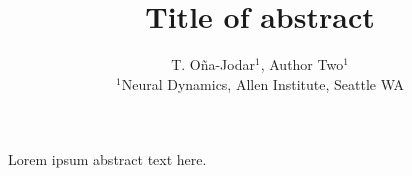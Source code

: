 \documentclass[11pt]{article}
\title{\textbf{Title of abstract}}
\author{T. Oña-Jodar$^{1}$, Author Two$^{1}$\\
{\small $^{1}$Neural Dynamics, Allen Institute, Seattle WA}}
\date{}
\begin{document}
\maketitle
\thispagestyle{empty}

Lorem ipsum abstract text here.




\end{document}
